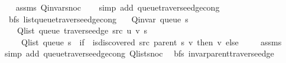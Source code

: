 \begin{isabellebody}
%
\isadelimproof
\ \ %
\endisadelimproof
%
\isatagproof
{}\isamarkupfalse%
\ assms\ Q{\isachardot}{\kern0pt}invar{\isacharunderscore}{\kern0pt}snoc\isanewline
\ \ \isamarkupfalse%
\ {\isacharparenleft}{\kern0pt}simp\ add{\isacharcolon}{\kern0pt}\ queue{\isacharunderscore}{\kern0pt}traverse{\isacharunderscore}{\kern0pt}edge{\isacharunderscore}{\kern0pt}cong{\isacharparenright}{\kern0pt}%
\endisatagproof
{\isafoldproof}%
%
\isadelimproof
\isanewline
%
\endisadelimproof
\isanewline
{}\isamarkupfalse%
\ {\isacharparenleft}{\kern0pt}\ bfs{\isacharparenright}{\kern0pt}\ list{\isacharunderscore}{\kern0pt}queue{\isacharunderscore}{\kern0pt}traverse{\isacharunderscore}{\kern0pt}edge{\isacharunderscore}{\kern0pt}cong{\isacharcolon}{\kern0pt}\isanewline
\ \ \ {\isachardoublequoteopen}Q{\isacharunderscore}{\kern0pt}invar\ {\isacharparenleft}{\kern0pt}queue\ s{\isacharparenright}{\kern0pt}{\isachardoublequoteclose}\isanewline
\ \ \isanewline
\ \ \ \ {\isachardoublequoteopen}Q{\isacharunderscore}{\kern0pt}list\ {\isacharparenleft}{\kern0pt}queue\ {\isacharparenleft}{\kern0pt}traverse{\isacharunderscore}{\kern0pt}edge\ src\ u\ v\ s{\isacharparenright}{\kern0pt}{\isacharparenright}{\kern0pt}\ {\isacharequal}{\kern0pt}\isanewline
\ \ \ \ \ Q{\isacharunderscore}{\kern0pt}list\ {\isacharparenleft}{\kern0pt}queue\ s{\isacharparenright}{\kern0pt}\ {\isacharat}{\kern0pt}\ {\isacharparenleft}{\kern0pt}if\ {\isasymnot}\ is{\isacharunderscore}{\kern0pt}discovered\ src\ {\isacharparenleft}{\kern0pt}parent\ s{\isacharparenright}{\kern0pt}\ v\ then\ {\isacharbrackleft}{\kern0pt}v{\isacharbrackright}{\kern0pt}\ else\ {\isacharbrackleft}{\kern0pt}{\isacharbrackright}{\kern0pt}{\isacharparenright}{\kern0pt}{\isachardoublequoteclose}\isanewline
%
\isadelimproof
\ \ %
\endisadelimproof
%
\isatagproof
{}\isamarkupfalse%
\ assms\isanewline
\ \ \isamarkupfalse%
\ {\isacharparenleft}{\kern0pt}simp\ add{\isacharcolon}{\kern0pt}\ queue{\isacharunderscore}{\kern0pt}traverse{\isacharunderscore}{\kern0pt}edge{\isacharunderscore}{\kern0pt}cong\ Q{\isachardot}{\kern0pt}list{\isacharunderscore}{\kern0pt}snoc{\isacharparenright}{\kern0pt}%
\endisatagproof
{\isafoldproof}%
%
\isadelimproof
\isanewline
%
\endisadelimproof
\isanewline
{}\isamarkupfalse%
\ {\isacharparenleft}{\kern0pt}\ bfs{\isacharparenright}{\kern0pt}\ invar{\isacharunderscore}{\kern0pt}parent{\isacharunderscore}{\kern0pt}traverse{\isacharunderscore}{\kern0pt}edge{\isacharcolon}{\kern0pt}\isanewline

\end{isabellebody}
